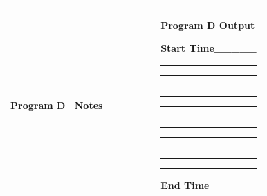 \documentclass[]{article}
\begin{document}
\begin{longtable}[]{@{}ll@{}}
\toprule
\begin{minipage}[t]{0.47\columnwidth}\raggedright\strut
{Program D ~Notes ~~~~~~~~}
\strut\end{minipage} &
\begin{minipage}[t]{0.47\columnwidth}\raggedright\strut
{Program D Output}

{}

{}

{Start Time\_\_\_\_\_}

{}

\begin{center}\rule{0.5\linewidth}{\linethickness}\end{center}

{}

\begin{center}\rule{0.5\linewidth}{\linethickness}\end{center}

{}

\begin{center}\rule{0.5\linewidth}{\linethickness}\end{center}

{}

\begin{center}\rule{0.5\linewidth}{\linethickness}\end{center}

{}

\begin{center}\rule{0.5\linewidth}{\linethickness}\end{center}

{}

\begin{center}\rule{0.5\linewidth}{\linethickness}\end{center}

{}

\begin{center}\rule{0.5\linewidth}{\linethickness}\end{center}

{}

\begin{center}\rule{0.5\linewidth}{\linethickness}\end{center}

{}

\begin{center}\rule{0.5\linewidth}{\linethickness}\end{center}

{}

\begin{center}\rule{0.5\linewidth}{\linethickness}\end{center}

{}

\begin{center}\rule{0.5\linewidth}{\linethickness}\end{center}

{}

{}

{End Time\_\_\_\_\_}
\strut\end{minipage}\tabularnewline
\bottomrule
\end{longtable}
\end{document}
